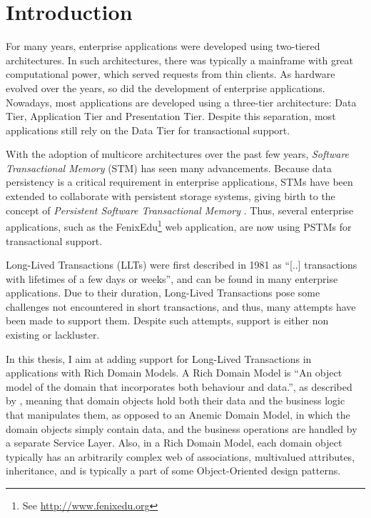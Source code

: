 \chapter{Introduction}

For many years, enterprise applications were developed using
two-tiered architectures. In such architectures, there was typically a
mainframe with great computational power, which served requests from
thin clients. As hardware evolved over the years, so did the
development of enterprise applications. Nowadays, most applications
are developed using a three-tier architecture: Data Tier, Application
Tier and Presentation Tier. Despite this separation, most applications
still rely on the Data Tier for transactional support.

With the adoption of multicore architectures over the past few years,
{\it Software Transactional Memory} (STM) has seen many advancements.
Because data persistency is a critical requirement in enterprise
applications, STMs have been extended to collaborate with persistent
storage systems, giving birth to the concept of {\it Persistent
  Software Transactional Memory} \cite{fernandes2011strict}. Thus,
several enterprise applications, such as the FenixEdu\footnote{See
  \url{http://www.fenixedu.org}} web application, are now using
PSTMs for transactional support.

Long-Lived Transactions (LLTs) were first described in 1981 as ``[..]
transactions with lifetimes of a few days or
weeks''\cite{gray1981transaction}, and can be found in many enterprise
applications. Due to their duration, Long-Lived Transactions pose some
challenges not encountered in short transactions, and thus, many
attempts have been made to support them. Despite such attempts,
support is either non existing or lackluster.

In this thesis, I aim at adding support for Long-Lived Transactions in
applications with Rich Domain Models.  A Rich Domain Model is ``An
object model of the domain that incorporates both behaviour and
data.'', as described by \cite{fowler2003patterns}, meaning that
domain objects hold both their data and the business logic that
manipulates them, as opposed to an Anemic Domain Model, in which the
domain objects simply contain data, and the business operations are
handled by a separate Service Layer. Also, in a Rich Domain Model,
each domain object typically has an arbitrarily complex web of
associations, multivalued attributes, inheritance, and is typically a
part of some Object-Oriented design patterns.


